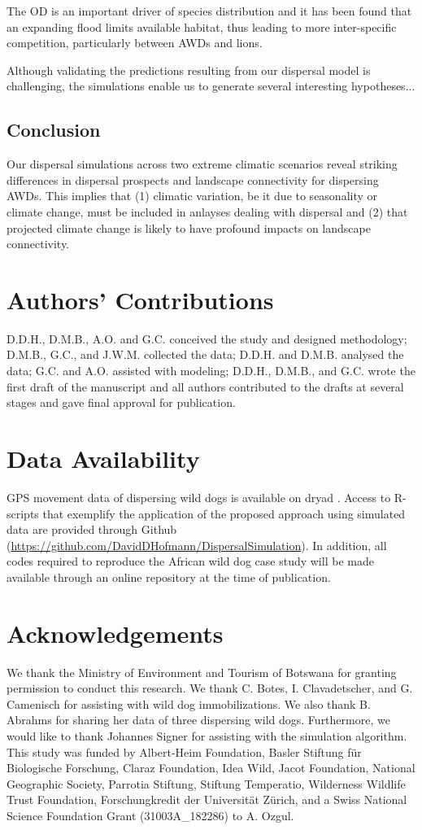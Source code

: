 \documentclass[abstract=on,10pt,a4paper,bibliography=totocnumbered]{article}
\begin{document}
The OD is an important driver of species distribution and it has been found that
an expanding flood limits available habitat, thus leading to more inter-specific
competition, particularly between AWDs and lions.

Although validating the predictions resulting from our dispersal model is
challenging, the simulations enable us to generate several interesting
hypotheses...

\subsection{Conclusion}
Our dispersal simulations across two extreme climatic scenarios reveal striking
differences in dispersal prospects and landscape connectivity for dispersing
AWDs. This implies that (1) climatic variation, be it due to seasonality or
climate change, must be included in anlayses dealing with dispersal and (2) that
projected climate change is likely to have profound impacts on landscape
connectivity.

\section{Authors' Contributions}
D.D.H., D.M.B., A.O. and G.C. conceived the study and designed methodology;
D.M.B., G.C., and J.W.M. collected the data; D.D.H. and D.M.B. analysed the
data; G.C. and A.O. assisted with modeling; D.D.H., D.M.B., and G.C. wrote the
first draft of the manuscript and all authors contributed to the drafts at
several stages and gave final approval for publication.

\section{Data Availability}
GPS movement data of dispersing wild dogs is available on dryad
\citep{Hofmann.2021b}. Access to R-scripts that exemplify the application of the
proposed approach using simulated data are provided through Github
(\url{https://github.com/DavidDHofmann/DispersalSimulation}). In addition, all
codes required to reproduce the African wild dog case study will be made
available through an online repository at the time of publication.

\section{Acknowledgements}
We thank the Ministry of Environment and Tourism of Botswana for granting
permission to conduct this research. We thank C. Botes, I. Clavadetscher, and G.
Camenisch for assisting with wild dog immobilizations. We also thank B. Abrahms
for sharing her data of three dispersing wild dogs. Furthermore, we would like
to thank Johannes Signer for assisting with the simulation algorithm. This study
was funded by Albert-Heim Foundation, Basler Stiftung für Biologische Forschung,
Claraz Foundation, Idea Wild, Jacot Foundation, National Geographic Society,
Parrotia Stiftung, Stiftung Temperatio, Wilderness Wildlife Trust Foundation,
Forschungkredit der Universität Zürich, and a Swiss National Science Foundation
Grant (31003A\_182286) to A. Ozgul.

\newpage
\begingroup
\singlespacing

\endgroup
\end{document}
